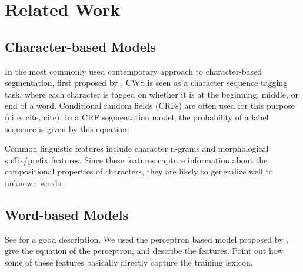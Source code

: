 \section{Related Work}

\subsection{Character-based Models}
In the most commonly used contemporary approach to character-based segmentation, first proposed by \cite{Xue:2003:IJCLCLP}, CWS is seen as a character sequence tagging task, where each character is tagged on whether it is at the beginning, middle, or end of a word. Conditional random fields (CRFs) are often used for this purpose (cite, cite, cite). In a CRF segmentation model, the probability of a label sequence is given by this equation:


Common linguistic features include character n-grams and morphological suffix/prefix features. Since these features capture information about the compositional properties of characters, they are likely to generalize well to unknown words.


\subsection{Word-based Models}

See \cite{Sun:2010:COLING} for a good description. We used the perceptron based model proposed by \cite{Zhang:2007:ACL}, give the equation of the perceptron, and describe the features. Point out how some of these features basically directly capture the training lexicon.
%
% 

